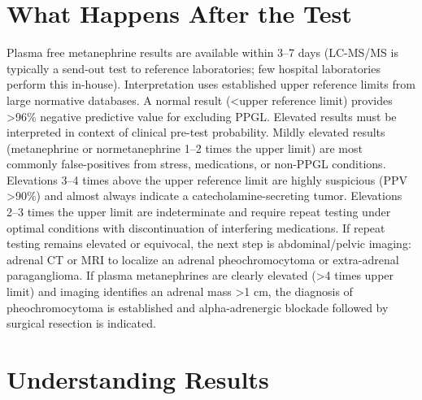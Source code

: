 \section*{What Happens After the Test}
Plasma free metanephrine results are available within 3--7 days (LC-MS/MS is typically a send-out test to reference laboratories; few hospital laboratories perform this in-house). Interpretation uses established upper reference limits from large normative databases. A normal result (<upper reference limit) provides >96\% negative predictive value for excluding PPGL. Elevated results must be interpreted in context of clinical pre-test probability. Mildly elevated results (metanephrine or normetanephrine 1--2 times the upper limit) are most commonly false-positives from stress, medications, or non-PPGL conditions. Elevations 3--4 times above the upper reference limit are highly suspicious (PPV >90\%) and almost always indicate a catecholamine-secreting tumor. Elevations 2--3 times the upper limit are indeterminate and require repeat testing under optimal conditions with discontinuation of interfering medications. If repeat testing remains elevated or equivocal, the next step is abdominal/pelvic imaging: adrenal CT or MRI to localize an adrenal pheochromocytoma or extra-adrenal paraganglioma. If plasma metanephrines are clearly elevated (>4 times upper limit) and imaging identifies an adrenal mass >1 cm, the diagnosis of pheochromocytoma is established and alpha-adrenergic blockade followed by surgical resection is indicated.

\section*{Understanding Results}

